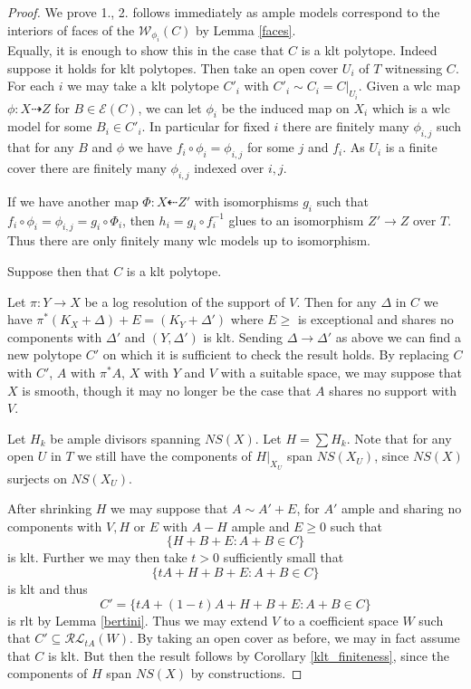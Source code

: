 	\begin{proof}
		We prove 1., 2. follows immediately as ample models correspond to the interiors of faces of the $\mathcal{W}_{\phi_{i}}(C)$ by Lemma \ref{faces}.\\	
		
		Equally, it is enough to show this in the case that $C$ is a klt polytope. Indeed suppose it holds for klt polytopes. Then take an open cover $U_{i}$ of $T$ witnessing $C$. For each $i$ we may take a klt polytope $C'_{i}$ with $C'_{i} \sim C_{i}=C|_{U_{i}}$. Given a wlc map $\phi:X \dashrightarrow Z$ for $B \in \mathcal{E}(C)$, we can let $\phi_{i}$ be the induced map on $X_{i}$ which is a wlc model for some $B_{i} \in C'_{i}$. In particular for fixed $i$ there are finitely many $\phi_{i,j}$ such that for any $B$ and $\phi$ we have $f_{i} \circ \phi_{i}=\phi_{i,j}$ for some $j$ and $f_{i}$. As $U_{i}$ is a finite cover there are finitely many $\phi_{i,j}$ indexed over $i,j$.
		
		If we have another map $\Phi:X \dashleftarrow Z'$ with isomorphisms $g_{i}$ such that $f_{i} \circ \phi_{i}=\phi_{i,j}= g_{i} \circ \Phi_{i}$, then $h_{i}=g_{i} \circ f^{-1}_{i}$ glues to an isomorphism $Z' \to Z$ over $T$. Thus there are only finitely many wlc models up to isomorphism.
		
		Suppose then that $C$ is a klt polytope.		
		
		Let $\pi:Y \to X$ be a log resolution of the support of $V$. Then for any $\Delta$ in $C$ we have $\pi^{*}(K_{X}+\Delta)+E=(K_{Y}+\Delta')$ where $E \geq $ is exceptional and shares no components with $\Delta'$ and $(Y,\Delta')$ is klt. Sending $\Delta \to \Delta'$ as above we can find a new polytope $C'$ on which it is sufficient to check the result holds. By replacing $C$ with $C'$, $A$ with $\pi^{*}A$, $X$ with $Y$ and $V$ with a suitable space, we may suppose that $X$ is smooth, though it may no longer be the case that $A$ shares no support with $V$. 
		
		Let $H_{k}$ be ample divisors spanning $NS(X)$. Let $H= \sum H_{k}$. Note that for any open $U$ in $T$ we still have the components of $H|_{X_{U}}$ span $NS(X_{U})$, since $NS(X)$ surjects on $NS(X_{U})$.
		
		After shrinking $H$ we may suppose that $A \sim A'+E$, for $A'$ ample and sharing no components with $V,H$ or $E$ with $A-H$ ample and $E \geq 0$ such that $$\{H+B+E \colon A+B \in C\}$$ is klt. Further we may then take $t >0$ sufficiently small that $$\{tA+H+B+E \colon A+B \in C\}$$ is klt and thus $$C'=\{tA+(1-t)A+H+B+E \colon A+B \in C\}$$ is rlt by Lemma \ref{bertini}. Thus we may extend $V$ to a coefficient space $W$ such that $C' \subseteq \mathcal{RL}_{tA}(W)$. By taking an open cover as before, we may in fact assume that $C$ is klt. But then the result follows by Corollary \ref{klt_finiteness}, since the components of $H$ span $NS(X)$ by constructions.	
		
	\end{proof}
	
